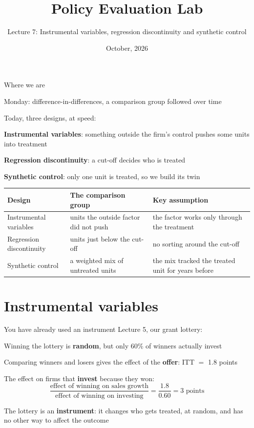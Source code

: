 \documentclass[aspectratio=169,xcolor=table]{beamer}
\title[Policy Evaluation Lab]{Policy Evaluation Lab}
\subtitle[Lecture 7]{Lecture 7: Instrumental variables, regression discontinuity and synthetic control}
\date[\pelYear]{October, 2026}
\begin{document}
\frame{\titlepage}

\begin{frame}{Where we are}
\small
\bi
  \item Monday: difference-in-differences, a comparison group followed over time
  \item Today, three designs, at speed:
    \bi
      \item \textbf{Instrumental variables}: something outside the firm's control pushes some units into treatment
      \item \textbf{Regression discontinuity}: a cut-off decides who is treated
      \item \textbf{Synthetic control}: only one unit is treated, so we build its twin
    \ei
\ei
\vspace{0.1cm}
\centering\footnotesize
\begin{tabular}{L{3.6cm}L{5.0cm}L{4.8cm}}
\toprule
\textbf{Design} & \textbf{The comparison group} & \textbf{Key assumption} \\
\midrule
Instrumental variables & units the outside factor did not push & the factor works only through the treatment \\
Regression discontinuity & units just below the cut-off & no sorting around the cut-off \\
Synthetic control & a weighted mix of untreated units & the mix tracked the treated unit for years before \\
\bottomrule
\end{tabular}
\end{frame}

\section{Instrumental variables}

\begin{frame}{You have already used an instrument}
\small
Lecture 5, our grant lottery:
\bi
  \item Winning the lottery is \textbf{random}, but only 60\% of winners actually invest
  \item Comparing winners and losers gives the effect of the \textbf{offer}: ITT $=$ 1.8 points
  \item The effect on firms that \textbf{invest} because they won:
\ei
\[ \frac{\text{effect of winning on sales growth}}{\text{effect of winning on investing}} = \frac{1.8}{0.60} = 3 \text{ points} \]
\begin{block}{}
The lottery is an \textbf{instrument}: it changes who gets treated, at random, and has no other way to affect the outcome
\end{block}
\end{frame}
\end{document}
